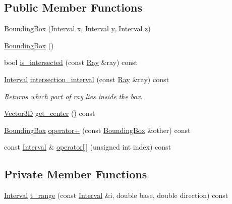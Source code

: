 \subsection*{Public Member Functions}
\begin{DoxyCompactItemize}
\item 
\hyperlink{classBoundingBox_a4120184a9340ea9a0c43285c9d0f18bf}{Bounding\+Box} (\hyperlink{classInterval}{Interval} \hyperlink{classBoundingBox_a93ea5f12ef2300fe61925f6b44faaebe}{x}, \hyperlink{classInterval}{Interval} \hyperlink{classBoundingBox_a593fd6b66d3ed0352d92024685863090}{y}, \hyperlink{classInterval}{Interval} \hyperlink{classBoundingBox_a9a6005ebe3550447aad804123fa68fea}{z})
\item 
\hyperlink{classBoundingBox_a6e401c4da5839950f1f30c8b8c4d1208}{Bounding\+Box} ()
\item 
bool \hyperlink{classBoundingBox_a8f8eca09001b89f0c80566731fb3ef99}{is\+\_\+intersected} (const \hyperlink{classRay}{Ray} \&ray) const 
\item 
\hyperlink{classInterval}{Interval} \hyperlink{classBoundingBox_a23a907bb7dfdcd0bd60a9e1cd59bda35}{intersection\+\_\+interval} (const \hyperlink{classRay}{Ray} \&ray) const 
\begin{DoxyCompactList}\small\item\em Returns which part of ray lies inside the box. \end{DoxyCompactList}\item 
\hyperlink{classVector3D}{Vector3D} \hyperlink{classBoundingBox_aee02002578e3f3a0d1046f1c6da86d7b}{get\+\_\+center} () const 
\item 
\hyperlink{classBoundingBox}{Bounding\+Box} \hyperlink{classBoundingBox_a58ea4f5a93b79953b5f971a7e1cb2e9c}{operator+} (const \hyperlink{classBoundingBox}{Bounding\+Box} \&other) const 
\item 
const \hyperlink{classInterval}{Interval} \& \hyperlink{classBoundingBox_a3db32eae066cb2af88dbe9394b58db9f}{operator\mbox{[}$\,$\mbox{]}} (unsigned int index) const 
\end{DoxyCompactItemize}
\subsection*{Private Member Functions}
\begin{DoxyCompactItemize}
\item 
\hyperlink{classInterval}{Interval} \hyperlink{classBoundingBox_a708734f01854529bbdb0c3b2a33461d5}{t\+\_\+range} (const \hyperlink{classInterval}{Interval} \&i, double base, double direction) const 
\end{DoxyCompactItemize}
